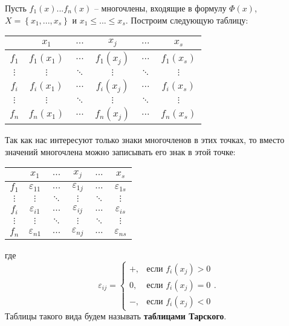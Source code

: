 Пусть $f_1(x) ... f_n(x)$ -- многочлены, входящие в формулу $\Phi(x)$, $X = \left\{x_1, ... , x_s\right\}$ и $x_1 \leq ... \leq x_s$. Построим следующую таблицу:
\begin{center}
    \begin{tabular}{ |c|c|c|c|c|c| } 
    \hline
                 & $x_1$ & $...$ & $x_j$ & $...$ & $x_s$ \\ 
    \hline
        $f_1$ & $f_1(x_1)$ & $...$ & $f_1(x_j)$ & $...$ & $f_1(x_s)$\\ 
    \hline
        $\vdots$ & $\vdots$ & $\ddots$ & $\vdots$ & $\ddots$ & $\vdots$ \\
    \hline
        $f_i$ & $f_i(x_1)$ & $...$ & $f_i(x_j)$ & $...$ & $f_i(x_s)$\\ 
    \hline
        $\vdots$ & $\vdots$ & $\ddots$ & $\vdots$ & $\ddots$ & $\vdots$ \\
    \hline
        $f_n$ & $f_n(x_1)$ & $...$ & $f_n(x_j)$ & $...$ & $f_n(x_s)$\\    
    \hline
    \end{tabular}
\end{center}
Так как нас интересуют только знаки многочленов в этих точках, то вместо значений многочлена можно записывать его знак в этой точке:
\begin{center}
    \begin{tabular}{ |c|c|c|c|c|c| } 
    \hline
                 & $x_1$ & $...$ & $x_j$ & $...$ & $x_s$ \\ 
    \hline
        $f_1$ & $\varepsilon_{11}$ & $...$ & $\varepsilon_{1j}$ & $...$ & $\varepsilon_{1s}$\\ 
    \hline
        $\vdots$ & $\vdots$ & $\ddots$ & $\vdots$ & $\ddots$ & $\vdots$ \\
    \hline
        $f_i$ & $\varepsilon_{i1}$ & $...$ & $\varepsilon_{ij}$ & $...$ & $\varepsilon_{is}$\\ 
    \hline
        $\vdots$ & $\vdots$ & $\ddots$ & $\vdots$ & $\ddots$ & $\vdots$ \\
    \hline
        $f_n$ & $\varepsilon_{n1}$ & $...$ & $\varepsilon_{nj}$ & $...$ & $\varepsilon_{ns}$\\    
    \hline
    \end{tabular}
\end{center}
где 
\begin{equation*}
    \varepsilon_{ij} = 
    \begin{cases}
        +, &\text{если $f_i(x_j) > 0$} \\
        0, &\text{если $f_i(x_j) = 0$} \\
        -, &\text{если $f_i(x_j) < 0$}
    \end{cases}.
\end{equation*}
Таблицы такого вида будем называть \textbf{таблицами Тарского}. 

